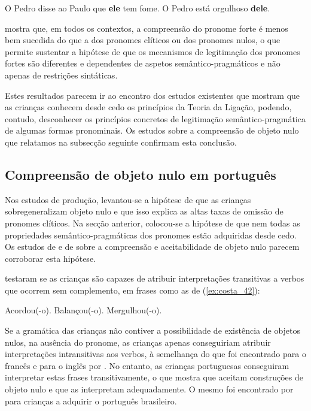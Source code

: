 \documentclass[output=paper]{LSP/langsci}
\begin{document}
\ea\label{ex:costa_40}
O Pedro disse ao Paulo que \textbf{ele} tem fome.
\z
\ea\label{ex:costa_41}
O Pedro está orgulhoso \textbf{dele}.
\z

\citet{silva2015} mostra que, em todos os contextos, a compreensão do pronome forte é menos bem sucedida do que a dos pronomes clíticos ou dos pronomes nulos, o que permite sustentar a hipótese de que os mecanismos de legitimação dos pronomes fortes são diferentes e dependentes de aspetos semântico-pragmáticos e não apenas de restrições sintáticas.

Estes resultados parecem ir ao encontro dos estudos existentes que mostram que as crianças conhecem desde cedo os princípios da Teoria da Ligação, podendo, contudo, desconhecer os princípios concretos de legitimação semântico-pragmática de algumas formas pronominais. Os estudos sobre a compreensão de objeto nulo que relatamos na subsecção seguinte confirmam esta conclusão.

\subsection{Compreensão de objeto nulo em português}
\label{subsec:costa_compreensao_obj_nulo}

Nos estudos de produção, levantou-se a hipótese de que as crianças sobregeneralizam objeto nulo e que isso explica as altas taxas de omissão de pronomes clíticos. Na secção anterior, colocou-se a hipótese de que nem todas as propriedades se\-mân\-ti\-co-prag\-má\-ti\-cas dos pronomes estão adquiridas desde cedo. Os estudos de \citet{costalobo2009,costalobo2010} e de \citet{costagrolla_etal2015} sobre a compreensão e aceitabilidade de objeto nulo parecem corroborar esta hipótese.

\citet{costalobo2009} testaram se as crianças são capazes de atribuir interpretações transitivas a verbos que ocorrem sem complemento, em frases como as de (\ref{ex:costa_42}):

\ea\label{ex:costa_42}
\ea\label{ex:costa_42a} Acordou(-o).
\ex\label{ex:costa_42b} Balançou(-o).
\ex\label{ex:costa_42c} Mergulhou(-o).
\zl

Se a gramática das crianças não contiver a possibilidade de existência de objetos nulos, na ausência do pronome, as crianças apenas conseguiriam atribuir interpretações intransitivas aos verbos, à semelhança do que foi encontrado para o francês e para o inglês por \citet{gruter2006}. No entanto, as crianças portuguesas conseguiram interpretar estas frases transitivamente, o que mostra que aceitam construções de objeto nulo e que as interpretam adequadamente. O mesmo foi encontrado por \citet{costagrolla_etal2015} para crianças a adquirir o português brasileiro.
\end{document}
